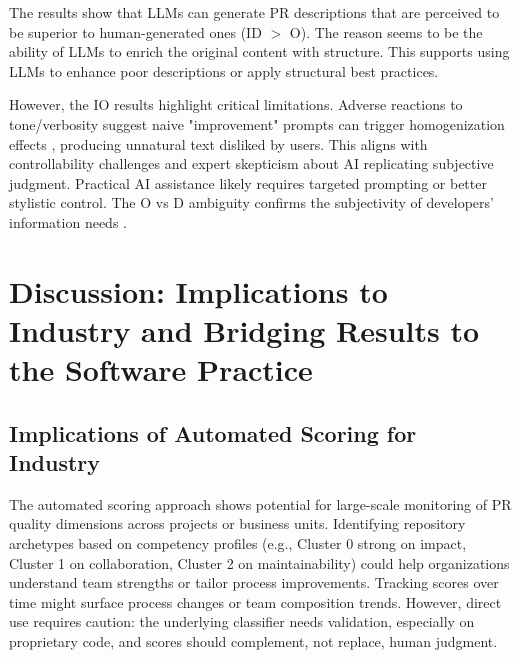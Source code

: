 \documentclass[conference]{IEEEtran}
\begin{document}
The results show that LLMs can generate PR descriptions that are perceived to be superior to human-generated ones (ID $>$ O). The reason seems to be the ability of LLMs to enrich the original content with structure. This supports using LLMs to enhance poor descriptions or apply structural best practices.

However, the IO results highlight critical limitations. Adverse reactions to tone/verbosity suggest naive "improvement" prompts can trigger homogenization effects \cite{lee2025poor}, producing unnatural text disliked by users. This aligns with controllability challenges \cite{lee2025poor, yang2024survey} and expert skepticism about AI replicating subjective judgment. Practical AI assistance likely requires targeted prompting or better stylistic control. The O vs D ambiguity confirms the subjectivity of developers' information needs \cite{bacchelli2013expectations}.

\section{Discussion: Implications to Industry and Bridging Results to the Software Practice} \label{sec:implications}

\subsection{Implications of Automated Scoring for Industry}
The automated scoring approach shows potential for large-scale monitoring of PR quality dimensions across projects or business units. Identifying repository archetypes based on competency profiles (e.g., Cluster 0 strong on impact, Cluster 1 on collaboration, Cluster 2 on maintainability) could help organizations understand team strengths or tailor process improvements. Tracking scores over time might surface process changes or team composition trends. However, direct use requires caution: the underlying classifier needs validation, especially on proprietary code, and scores should complement, not replace, human judgment.
\end{document}
